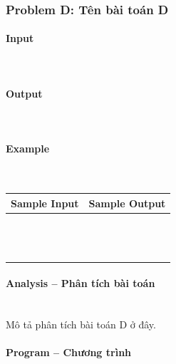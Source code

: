 \documentclass{article}
\begin{document}
\subsubsection{Problem D: Tên bài toán D}

\paragraph{Input} \mbox{} \\



\paragraph{Output}\mbox{} \\


\paragraph{Example}\mbox{} \\

\begin{table}[h]
    \centering
    \begin{tabular}{|l|r|}
        \hline
        \textbf{Sample Input} & \textbf{Sample Output} \\
        \hline
		&  \\ 
		&  \\ 
		&  \\ 
		&  \\ 
		&  \\
		&  \\ 
		&  \\ 
		&  \\ 
		&  \\ 
		&  \\ 
		&  \\ 
		&  \\
		&  \\ \hline
    \end{tabular}
\end{table}

\paragraph{Analysis -- Phân tích bài toán} \mbox{} \\

Mô tả phân tích bài toán D ở đây.

\paragraph{Program -- Chương trình} \mbox{} \\
\end{document}
